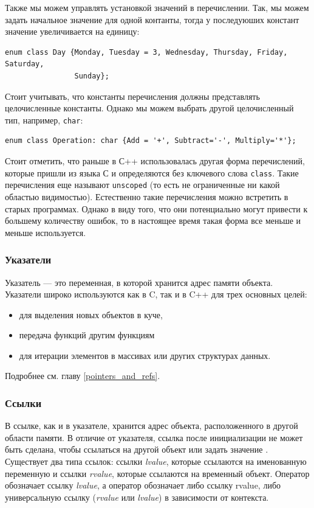 Также мы можем управлять установкой значений в перечислении. Так, мы можем задать начальное значение для одной контанты, тогда у последуюших констант значение увеличивается на единицу:
\begin{verbatim}
enum class Day {Monday, Tuesday = 3, Wednesday, Thursday, Friday, Saturday, 
                Sunday};
\end{verbatim}

Стоит учитывать, что константы перечисления должны представлять целочисленные константы. Однако мы можем выбрать другой целочисленный тип, например, \texttt{char}:

\begin{verbatim}
enum class Operation: char {Add = '+', Subtract='-', Multiply='*'};
\end{verbatim}

Стоит отметить, что раньше в С++ использовалась другая форма перечислений, которые пришли из языка С и определяются без ключевого слова \texttt{class}. Такие перечисления еще называют \texttt{unscoped} (то есть не ограниченные ни какой областью видимостью). Естественно такие перечисления можно встретить в старых программах. Однако в виду того, что они потенциально могут привести к большему количеству ошибок, то в настоящее время такая форма все меньше и меньше используется.

\subsubsection{Указатели}

Указатель — это переменная, в которой хранится адрес памяти объекта. Указатели широко используются как в C, так и в C++ для трех основных целей:
\begin{itemize}
    \item для выделения новых объектов в куче,
    \item передача функций другим функциям
    \item для итерации элементов в массивах или других структурах данных.
\end{itemize}

Подробнее см. главу \ref{pointers_and_refs}.

\subsubsection{Ссылки}

В ссылке, как и в указателе, хранится адрес объекта, расположенного в другой области памяти. В отличие от указателя, ссылка после инициализации не может быть сделана, чтобы ссылаться на другой объект или задать значение . Существует два типа ссылок: ссылки \textit{lvalue}, которые ссылаются на именованную переменную и ссылки \textit{rvalue}, которые ссылаются на временный объект. Оператор \mverb{&} обозначает ссылку \textit{lvalue}, а \mverb{&&} оператор обозначает либо ссылку rvalue, либо универсальную ссылку (\textit{rvalue} или \textit{lvalue}) в зависимости от контекста.

